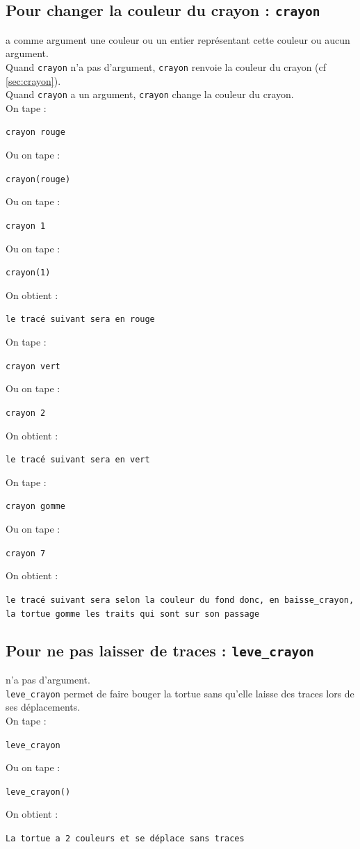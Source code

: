 \documentclass[a4paper,11pt]{book}
\begin{document}
\subsection{Pour changer la couleur du crayon : {\tt crayon}}\label{sec:fcrayon}
 a comme argument une couleur ou un entier repr\'esentant 
cette couleur ou aucun argument.\\
Quand {\tt crayon} n'a pas d'argument, {\tt crayon} renvoie la couleur du 
crayon (cf \ref{sec:crayon}).\\
Quand {\tt crayon} a un argument, {\tt crayon} change la couleur du crayon.\\
On tape :
\begin{center}{\tt crayon rouge}\end{center}
Ou on tape :
\begin{center}{\tt crayon(rouge)}\end{center}
Ou on tape :
\begin{center}{\tt crayon 1}\end{center}
Ou on tape :
\begin{center}{\tt crayon(1)}\end{center}
On obtient :
\begin{center}{\tt le trac\'e suivant sera en rouge}\end{center}
On tape :
\begin{center}{\tt crayon vert}\end{center}
Ou on tape :
\begin{center}{\tt crayon 2}\end{center}
On obtient :
\begin{center}{\tt le trac\'e suivant sera en vert}\end{center}
On tape :
\begin{center}{\tt crayon gomme}\end{center}
Ou on tape :
\begin{center}{\tt crayon 7}\end{center}
On obtient :
\begin{center}{\tt le trac\'e suivant sera selon la couleur du fond donc, en baisse\_crayon, la tortue gomme les traits qui sont sur son passage}\end{center}

\subsection{Pour ne pas laisser de traces : {\tt leve\_crayon}}
 n'a pas d'argument.\\
{\tt leve\_crayon} permet de faire bouger la tortue sans qu'elle laisse des 
traces lors de ses d\'eplacements.\\
On tape :
\begin{center}{\tt leve\_crayon}\end{center}
Ou on tape :
\begin{center}{\tt leve\_crayon()}\end{center}
On obtient :
\begin{center}{\tt La tortue a 2 couleurs et se d\'eplace sans traces}\end{center}
\end{document}
